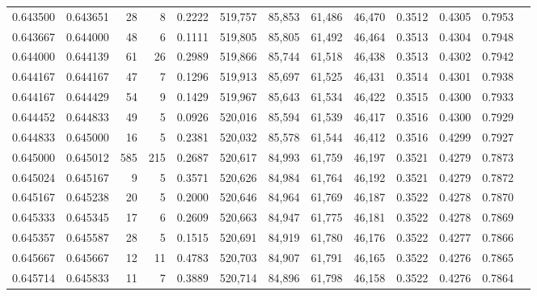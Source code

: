 \begin{tabular}{rrrrrrrrrrrrr}
0.643500 & 0.643651 &    28 &   8 &                                     0.2222 & 519,757 &  85,853 &  61,486 &  46,470 & 0.3512 & 0.4305 & 0.7953 \\
0.643667 & 0.644000 &    48 &   6 &                                     0.1111 & 519,805 &  85,805 &  61,492 &  46,464 & 0.3513 & 0.4304 & 0.7948 \\
0.644000 & 0.644139 &    61 &  26 &                                     0.2989 & 519,866 &  85,744 &  61,518 &  46,438 & 0.3513 & 0.4302 & 0.7942 \\
0.644167 & 0.644167 &    47 &   7 &                                     0.1296 & 519,913 &  85,697 &  61,525 &  46,431 & 0.3514 & 0.4301 & 0.7938 \\
0.644167 & 0.644429 &    54 &   9 &                                     0.1429 & 519,967 &  85,643 &  61,534 &  46,422 & 0.3515 & 0.4300 & 0.7933 \\
0.644452 & 0.644833 &    49 &   5 &                                     0.0926 & 520,016 &  85,594 &  61,539 &  46,417 & 0.3516 & 0.4300 & 0.7929 \\
0.644833 & 0.645000 &    16 &   5 &                                     0.2381 & 520,032 &  85,578 &  61,544 &  46,412 & 0.3516 & 0.4299 & 0.7927 \\
0.645000 & 0.645012 &   585 & 215 &                                     0.2687 & 520,617 &  84,993 &  61,759 &  46,197 & 0.3521 & 0.4279 & 0.7873 \\
0.645024 & 0.645167 &     9 &   5 &                                     0.3571 & 520,626 &  84,984 &  61,764 &  46,192 & 0.3521 & 0.4279 & 0.7872 \\
0.645167 & 0.645238 &    20 &   5 &                                     0.2000 & 520,646 &  84,964 &  61,769 &  46,187 & 0.3522 & 0.4278 & 0.7870 \\
0.645333 & 0.645345 &    17 &   6 &                                     0.2609 & 520,663 &  84,947 &  61,775 &  46,181 & 0.3522 & 0.4278 & 0.7869 \\
0.645357 & 0.645587 &    28 &   5 &                                     0.1515 & 520,691 &  84,919 &  61,780 &  46,176 & 0.3522 & 0.4277 & 0.7866 \\
0.645667 & 0.645667 &    12 &  11 &                                     0.4783 & 520,703 &  84,907 &  61,791 &  46,165 & 0.3522 & 0.4276 & 0.7865 \\
0.645714 & 0.645833 &    11 &   7 &                                     0.3889 & 520,714 &  84,896 &  61,798 &  46,158 & 0.3522 & 0.4276 & 0.7864 \\

\end{tabular}
